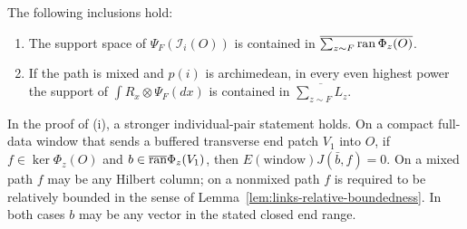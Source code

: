\begin{proposition}
\label{prop:transfer-incidence}
The following inclusions hold:
\begin{enumerate}[label=\textup{(\roman*)}]
\item The support space of $\Psi_F(\mathcal I_i(O))$ is contained in
$\overline{\sum_{z\sim F}\operatorname{ran}\Phi_z(O)}$.
\item If the path is mixed and $p(i)$ is archimedean, in every even
highest power the support of
$\int R_x\otimes\Psi_F(dx)$ is contained in
$\overline{\sum_{z\sim F}L_z}$.
\end{enumerate}
In the proof of \textup{(i)}, a stronger individual-pair statement
holds. On a compact full-data window that sends a buffered transverse
end patch $V_1$ into $O$, if $f\in\ker\Phi_z(O)$ and
$b\in\overline{\operatorname{ran}}\Phi_z(V_1)$, then
$E(\mathrm{window})J(\bar b,f)=0$. On a mixed path $f$ may be any Hilbert column; on a nonmixed path
$f$ is required to be relatively bounded in the sense of
Lemma~\ref{lem:links-relative-boundedness}. In both cases $b$ may
be any vector in the stated closed end range.
\end{proposition}

